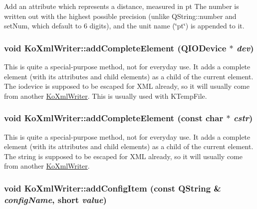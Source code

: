 \label{classKoXmlWriter_a59281d5370c489c60515726e0b38ccd0}
Add an attribute which represents a distance, measured in pt The number is written out with the highest possible precision (unlike QString::number and setNum, which default to 6 digits), and the unit name (\char`\"{}pt\char`\"{}) is appended to it. \hypertarget{classKoXmlWriter_a0bc25d326f56ee58c095d2e6287d6b7d}{
\subsubsection[{addCompleteElement}]{\setlength{\rightskip}{0pt plus 5cm}void KoXmlWriter::addCompleteElement (QIODevice $\ast$ {\em dev})}}
\label{classKoXmlWriter_a0bc25d326f56ee58c095d2e6287d6b7d}
This is quite a special-\/purpose method, not for everyday use. It adds a complete element (with its attributes and child elements) as a child of the current element. The iodevice is supposed to be escaped for XML already, so it will usually come from another \hyperlink{classKoXmlWriter}{KoXmlWriter}. This is usually used with KTempFile. \hypertarget{classKoXmlWriter_acc98c1f1d995a792c7a0e4b2945954ff}{
\subsubsection[{addCompleteElement}]{\setlength{\rightskip}{0pt plus 5cm}void KoXmlWriter::addCompleteElement (const char $\ast$ {\em cstr})}}
\label{classKoXmlWriter_acc98c1f1d995a792c7a0e4b2945954ff}
This is quite a special-\/purpose method, not for everyday use. It adds a complete element (with its attributes and child elements) as a child of the current element. The string is supposed to be escaped for XML already, so it will usually come from another \hyperlink{classKoXmlWriter}{KoXmlWriter}. \hypertarget{classKoXmlWriter_a517c0ff99e13b5f20df48b9b49bffcca}{
\subsubsection[{addConfigItem}]{\setlength{\rightskip}{0pt plus 5cm}void KoXmlWriter::addConfigItem (const QString \& {\em configName}, \/  short {\em value})}}
